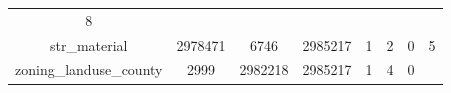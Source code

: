 \documentclass[]{book}
\theoremstyle{definition}
\theoremstyle{definition}
\theoremstyle{definition}
\theoremstyle{remark}
\begin{document}
\begin{longtable}[]{@{}cccccccc@{}}
\begin{minipage}[t]{0.09\columnwidth}
8\strut
\end{minipage}\tabularnewline
\begin{minipage}[t]{0.23\columnwidth}\centering\strut
str\_material\strut
\end{minipage} & \begin{minipage}[t]{0.09\columnwidth}\centering\strut
2978471\strut
\end{minipage} & \begin{minipage}[t]{0.10\columnwidth}\centering\strut
6746\strut
\end{minipage} & \begin{minipage}[t]{0.09\columnwidth}\centering\strut
2985217\strut
\end{minipage} & \begin{minipage}[t]{0.05\columnwidth}\centering\strut
1\strut
\end{minipage} & \begin{minipage}[t]{0.05\columnwidth}\centering\strut
2\strut
\end{minipage} & \begin{minipage}[t]{0.07\columnwidth}\centering\strut
0\strut
\end{minipage} & \begin{minipage}[t]{0.09\columnwidth}\centering\strut
5\strut
\end{minipage}\tabularnewline
\begin{minipage}[t]{0.23\columnwidth}\centering\strut
zoning\_landuse\_county\strut
\end{minipage} & \begin{minipage}[t]{0.09\columnwidth}\centering\strut
2999\strut
\end{minipage} & \begin{minipage}[t]{0.10\columnwidth}\centering\strut
2982218\strut
\end{minipage} & \begin{minipage}[t]{0.09\columnwidth}\centering\strut
2985217\strut
\end{minipage} & \begin{minipage}[t]{0.05\columnwidth}\centering\strut
1\strut
\end{minipage} & \begin{minipage}[t]{0.05\columnwidth}\centering\strut
4\strut
\end{minipage} & \begin{minipage}[t]{0.07\columnwidth}\centering\strut
0\strut
\end{minipage} & \begin{minipage}[t]{0.09\columnwidth}\centering\strut

\end{minipage}
\end{longtable}
\end{document}
